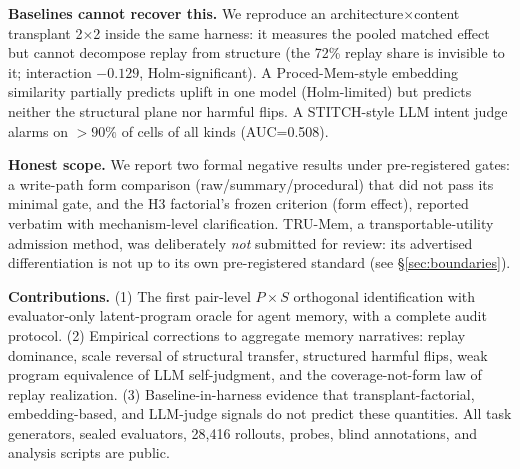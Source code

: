\textbf{Baselines cannot recover this.} We reproduce an architecture$\times$content transplant 2$\times$2 \citep{feng2026transplants} inside the same harness: it measures the pooled matched effect but cannot decompose replay from structure (the 72\% replay share is invisible to it; interaction $-0.129$, Holm-significant). A Proced-Mem-style embedding similarity \citep{procedmem2025} partially predicts uplift in one model (Holm-limited) but predicts neither the structural plane nor harmful flips. A STITCH-style LLM intent judge \citep{stitch2026camebench} alarms on $>90\%$ of cells of all kinds (AUC=0.508).

\textbf{Honest scope.} We report two formal negative results under pre-registered gates: a write-path form comparison (raw/summary/procedural) that did not pass its minimal gate, and the H3 factorial's frozen criterion (form effect), reported verbatim with mechanism-level clarification. TRU-Mem, a transportable-utility admission method, was deliberately \emph{not} submitted for review: its advertised differentiation is not up to its own pre-registered standard (see \S\ref{sec:boundaries}).

\textbf{Contributions.} (1) The first pair-level $P\times S$ orthogonal identification with evaluator-only latent-program oracle for agent memory, with a complete audit protocol. (2) Empirical corrections to aggregate memory narratives: replay dominance, scale reversal of structural transfer, structured harmful flips, weak program equivalence of LLM self-judgment, and the coverage-not-form law of replay realization. (3) Baseline-in-harness evidence that transplant-factorial, embedding-based, and LLM-judge signals do not predict these quantities. All task generators, sealed evaluators, 28{,}416 rollouts, probes, blind annotations, and analysis scripts are public.

